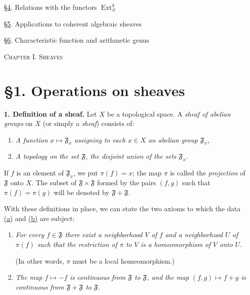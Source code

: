 \noindent\hyperref[fac:III:4]{\S4}. Relations with the functors $\operatorname{Ext}^q_S$

\noindent\hyperref[fac:III:5]{\S5}. Applications to coherent algebraic sheaves

\noindent\hyperref[fac:III:6]{\S6}. Characteristic function and arithmetic genus

\begin{center}
\label{fac:I}
{\Large\textsc{Chapter I. Sheaves}}
\end{center}

\label{fac:I:1}
\section*{\S1. Operations on sheaves}

\label{fac:I:1:no:1}
\textbf{1. Definition of a sheaf.} Let $X$ be a topological space. A \textit{sheaf of abelian groups} on $X$ (or simply a \textit{sheaf}) consists of:

\begin{enumerate}[label=(\alph*),leftmargin=2.5em]
\item\label{fac:I:1:no:1:data:item:a} \textit{A function $x\mapsto\mathfrak{F}_x$ assigning to each $x\in X$ an abelian group $\mathfrak{F}_x$,}
\item\label{fac:I:1:no:1:data:item:b} \textit{A topology on the set $\mathfrak{F}$, the disjoint union of the sets $\mathfrak{F}_x$.}
\end{enumerate}

If $f$ is an element of $\mathfrak{F}_x$, we put $\pi(f)=x$; the map $\pi$ is called the \textit{projection} of $\mathfrak{F}$ onto $X$. The subset of $\mathfrak{F}\times\mathfrak{F}$ formed by the pairs $(f,g)$ such that $\pi(f)=\pi(g)$ will be denoted by $\mathfrak{F}+\mathfrak{F}$.

With these definitions in place, we can state the two axioms to which the data \hyperref[fac:I:1:no:1:data:item:a]{(a)} and \hyperref[fac:I:1:no:1:data:item:b]{(b)} are subject:

\begin{enumerate}[label=(\Roman*),leftmargin=3em]
\item\label{fac:I:1:no:1:axiom:I} \textit{For every $f\in\mathfrak{F}$ there exist a neighborhood $V$ of $f$ and a neighborhood $U$ of $\pi(f)$ such that the restriction of $\pi$ to $V$ is a homeomorphism of $V$ onto $U$.}

(In other words, $\pi$ must be a local homeomorphism.)

\item\label{fac:I:1:no:1:axiom:II} \textit{The map $f\mapsto-f$ is continuous from $\mathfrak{F}$ to $\mathfrak{F}$, and the map $(f,g)\mapsto f+g$ is continuous from $\mathfrak{F}+\mathfrak{F}$ to $\mathfrak{F}$.}
\end{enumerate}

